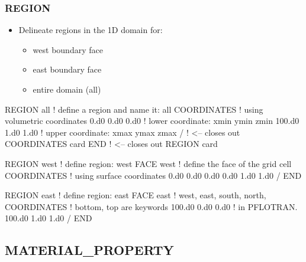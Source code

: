 \documentclass{beamer}
\newcommand\redcomment[1]{{{\color{red} #1}}}
\newcommand\bluecomment[1]{{{\color{blue} #1}}}
\newcommand\greencomment[1]{{{\color{green} #1}}}
\begin{document}
\begin{frame}\frametitle{REGION}

\begin{itemize}
  \item Delineate regions in the 1D domain for:
  \begin{itemize}
    \item west boundary face
    \item east boundary face
    \item entire domain (all)
  \end{itemize}
\end{itemize}

\begin{semiverbatim}
REGION all            \bluecomment{! define a region and name it: \greencomment{all}}
  COORDINATES         \bluecomment{! using \redcomment{volumetric} coordinates}
    0.d0 0.d0 0.d0    \bluecomment{! lower coordinate: xmin ymin zmin}
    100.d0 1.d0 1.d0  \bluecomment{! upper coordinate: xmax ymax zmax}
  /   \bluecomment{! <-- closes out COORDINATES card}
END   \bluecomment{! <-- closes out REGION card}

\newpage
REGION west           \bluecomment{! define region:} \greencomment{west}
  FACE west           \bluecomment{! define the face of the grid cell}
  COORDINATES         \bluecomment{! using \redcomment{surface} coordinates}
    0.d0 0.d0 0.d0
    0.d0 1.d0 1.d0
  /
END

REGION east           \bluecomment{! define region:} \greencomment{east}
  FACE east           \redcomment{! west, east, south, north,}
  COORDINATES         \redcomment{!   bottom, top} \bluecomment{ are keywords}
    100.d0 0.d0 0.d0  \bluecomment{!   in PFLOTRAN.}
    100.d0 1.d0 1.d0
  /
END

\end{semiverbatim}

\end{frame}

\subsection{MATERIAL\_PROPERTY}
\end{document}
